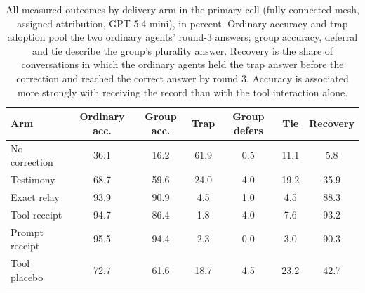 \begin{table}[!ht]
\centering
\caption{All measured outcomes by delivery arm in the primary
cell (fully connected mesh, assigned attribution, GPT-5.4-mini), in percent.
Ordinary accuracy and trap adoption pool the two ordinary agents' round-3
answers; group accuracy, deferral and tie describe the group's plurality
answer. Recovery is the share of conversations in which the ordinary agents
held the trap answer before the correction and reached the correct answer by
round 3. Accuracy is associated more strongly with receiving the record than with the tool interaction alone.}
\label{tab:outcomes}
\small
\begin{tabular}{lcccccc}
\toprule
Arm & Ordinary acc. & Group acc. & Trap & Group defers & Tie & Recovery \\
\midrule
No correction & 36.1 & 16.2 & 61.9 & 0.5 & 11.1 & 5.8 \\
Testimony & 68.7 & 59.6 & 24.0 & 4.0 & 19.2 & 35.9 \\
Exact relay & 93.9 & 90.9 & 4.5 & 1.0 & 4.5 & 88.3 \\
Tool receipt & 94.7 & 86.4 & 1.8 & 4.0 & 7.6 & 93.2 \\
Prompt receipt & 95.5 & 94.4 & 2.3 & 0.0 & 3.0 & 90.3 \\
Tool placebo & 72.7 & 61.6 & 18.7 & 4.5 & 23.2 & 42.7 \\
\bottomrule
\end{tabular}
\end{table}
